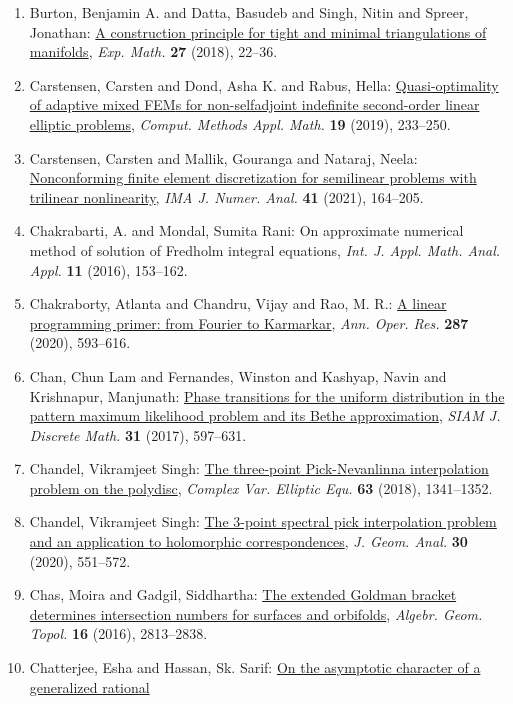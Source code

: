 \begin{enumerate}
\item Burton, Benjamin A. and Datta, Basudeb and Singh, Nitin and
Spreer, Jonathan: \href{https://doi.org/10.1080/10586458.2016.1212747}{A construction principle for tight and minimal triangulations
of manifolds}, \emph{Exp. Math.} {\bf 27} (2018), 22--36.
\item Carstensen, Carsten and Dond, Asha K. and Rabus, Hella: \href{https://doi.org/10.1515/cmam-2019-0034}{Quasi-optimality of adaptive mixed {FEM}s for non-selfadjoint
indefinite second-order linear elliptic problems}, \emph{Comput. Methods Appl. Math.} {\bf 19} (2019), 233--250.
\item Carstensen, Carsten and Mallik, Gouranga and Nataraj, Neela: \href{https://doi.org/10.1093/imanum/drz071}{Nonconforming finite element discretization for semilinear
problems with trilinear nonlinearity}, \emph{IMA J. Numer. Anal.} {\bf 41} (2021), 164--205.
\item Chakrabarti, A. and Mondal, Sumita Rani: On approximate numerical method of solution of {F}redholm
integral equations, \emph{Int. J. Appl. Math. Anal. Appl.} {\bf 11} (2016), 153--162.
\item Chakraborty, Atlanta and Chandru, Vijay and Rao, M. R.: \href{https://doi.org/10.1007/s10479-019-03186-2}{A linear programming primer: from {F}ourier to {K}armarkar}, \emph{Ann. Oper. Res.} {\bf 287} (2020), 593--616.
\item Chan, Chun Lam and Fernandes, Winston and Kashyap, Navin and
Krishnapur, Manjunath: \href{https://doi.org/10.1137/15M1028819}{Phase transitions for the uniform distribution in the pattern
maximum likelihood problem and its {B}ethe approximation}, \emph{SIAM J. Discrete Math.} {\bf 31} (2017), 597--631.
\item Chandel, Vikramjeet Singh: \href{https://doi.org/10.1080/17476933.2017.1370461}{The three-point {P}ick-{N}evanlinna interpolation problem on
the polydisc}, \emph{Complex Var. Elliptic Equ.} {\bf 63} (2018), 1341--1352.
\item Chandel, Vikramjeet Singh: \href{https://doi.org/10.1007/s12220-018-00123-w}{The 3-point spectral pick interpolation problem and an
application to holomorphic correspondences}, \emph{J. Geom. Anal.} {\bf 30} (2020), 551--572.
\item Chas, Moira and Gadgil, Siddhartha: \href{https://doi.org/10.2140/agt.2016.16.2813}{The extended {G}oldman bracket determines intersection numbers
for surfaces and orbifolds}, \emph{Algebr. Geom. Topol.} {\bf 16} (2016), 2813--2838.
\item Chatterjee, Esha and Hassan, Sk. Sarif: \href{https://doi.org/10.3934/dcds.2018070}{On the asymptotic character of a generalized rational
}
\end{enumerate}
